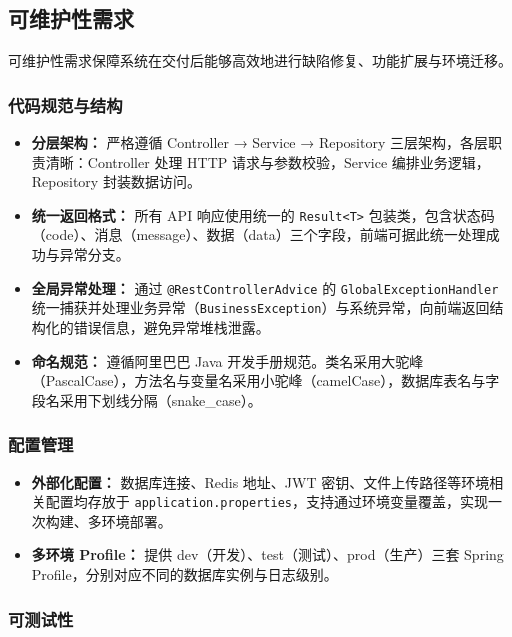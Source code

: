 \subsection{可维护性需求}

可维护性需求保障系统在交付后能够高效地进行缺陷修复、功能扩展与环境迁移。

\subsubsection{代码规范与结构}

\begin{itemize}
    \item \textbf{分层架构：} 严格遵循 Controller → Service → Repository 三层架构，各层职责清晰：Controller 处理 HTTP 请求与参数校验，Service 编排业务逻辑，Repository 封装数据访问。
    \item \textbf{统一返回格式：} 所有 API 响应使用统一的 \texttt{Result<T>} 包装类，包含状态码（code）、消息（message）、数据（data）三个字段，前端可据此统一处理成功与异常分支。
    \item \textbf{全局异常处理：} 通过 \texttt{@RestControllerAdvice} 的 \texttt{GlobalExceptionHandler} 统一捕获并处理业务异常（\texttt{BusinessException}）与系统异常，向前端返回结构化的错误信息，避免异常堆栈泄露。
    \item \textbf{命名规范：} 遵循阿里巴巴 Java 开发手册规范。类名采用大驼峰（PascalCase），方法名与变量名采用小驼峰（camelCase），数据库表名与字段名采用下划线分隔（snake\_case）。
\end{itemize}

\subsubsection{配置管理}

\begin{itemize}
    \item \textbf{外部化配置：} 数据库连接、Redis 地址、JWT 密钥、文件上传路径等环境相关配置均存放于 \texttt{application.properties}，支持通过环境变量覆盖，实现一次构建、多环境部署。
    \item \textbf{多环境 Profile：} 提供 dev（开发）、test（测试）、prod（生产）三套 Spring Profile，分别对应不同的数据库实例与日志级别。
\end{itemize}

\subsubsection{可测试性}

